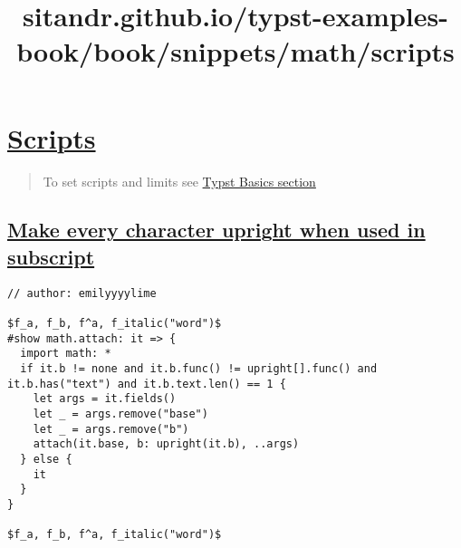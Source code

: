 \title{sitandr.github.io/typst-examples-book/book/snippets/math/scripts}

\section{\texorpdfstring{\hyperref[scripts]{Scripts}}{Scripts}}\label{scripts}

\begin{quote}
To set scripts and limits see \href{../../basics/math/limits.html}{Typst
Basics section}
\end{quote}

\subsection{\texorpdfstring{\hyperref[make-every-character-upright-when-used-in-subscript]{Make
every character upright when used in
subscript}}{Make every character upright when used in subscript}}\label{make-every-character-upright-when-used-in-subscript}

\begin{verbatim}
// author: emilyyyylime

$f_a, f_b, f^a, f_italic("word")$
#show math.attach: it => {
  import math: *
  if it.b != none and it.b.func() != upright[].func() and it.b.has("text") and it.b.text.len() == 1 {
    let args = it.fields()
    let _ = args.remove("base")
    let _ = args.remove("b")
    attach(it.base, b: upright(it.b), ..args)
  } else {
    it
  }
}

$f_a, f_b, f^a, f_italic("word")$
\end{verbatim}

\pandocbounded{}
